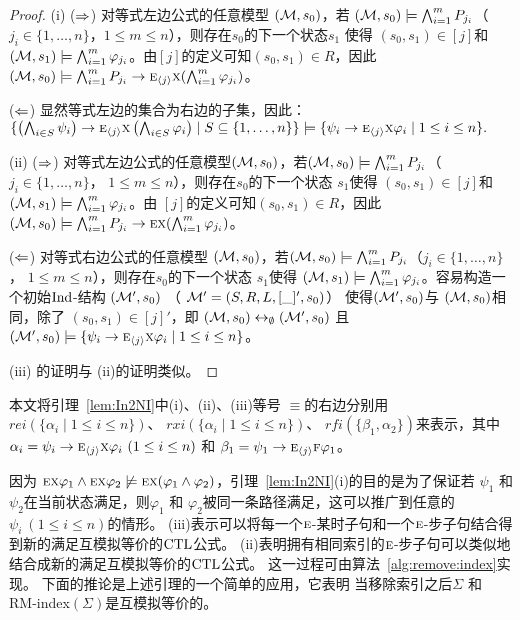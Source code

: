 \begin{proof}
	(i) ($\Rightarrow$) 对等式左边公式的任意模型 $({\cal M},s_0)$，若 $({\cal M},s_0) \models \bigwedge_{i=1}^m P_{j_i}$（ $j_i \in \{1, \dots, n\}$，$1\leq m \leq n$），则存在$s_0$的下一个状态$s_1$ 使得 $(s_0, s_1) \in [j]$和 $({\cal M}, s_1) \models \bigwedge_{i=1}^m \varphi_{j_i}$。由$[j]$的定义可知$(s_0, s_1) \in R$，因此$({\cal M}, s_0) \models \bigwedge_{i=1}^m P_{j_i} \rightarrow \textsc{e}_{{\langle{j}\rangle}} \textsc{x} (\bigwedge_{i=1}^m \varphi_{j_i})$。 %
	
	($\Leftarrow$)  显然等式左边的集合为右边的子集，因此：
	$\{\left(\bigwedge_{i\in S}\psi_i\right)\rightarrow \textsc{e}_{{\langle{j}\rangle}} \textsc{x} \left(\bigwedge_{i\in S}\varphi_i\right)\mid S\subseteq\{1,\dots, n\}\} \models \{\psi_i\rightarrow \textsc{e}_{{\langle{j}\rangle}} \textsc{x} \varphi_i \mid 1\le i\le n\}.$
	
	(ii) ($\Rightarrow$) 对等式左边公式的任意模型$({\cal M},s_0)$，若$({\cal M},s_0) \models \bigwedge_{i=1}^m P_{j_i}$（$j_i \in \{1, \dots, n\}$， $1\leq m \leq n$），则存在$s_0$的下一个状态 $s_1$使得 $(s_0, s_1) \in [j]$和$({\cal M}, s_1) \models \bigwedge_{i=1}^m \varphi_{j_i}$。由 $[j]$的定义可知$(s_0, s_1) \in R$，因此$({\cal M}, s_0) \models \bigwedge_{i=1}^m P_{j_i} \rightarrow \textsc{e} \textsc{x} (\bigwedge_{i=1}^m \varphi_{j_i})$。 %
	
	($\Leftarrow$) 对等式右边公式的任意模型 $({\cal M},s_0)$，若$({\cal M},s_0) \models \bigwedge_{i=1}^m P_{j_i}$（$j_i \in \{1, \dots, n\}$， $1\leq m \leq n$），则存在$s_0$的下一个状态 $s_1$使得 $({\cal M}, s_1) \models \bigwedge_{i=1}^m \varphi_{j_i}$。容易构造一个初始$\textrm{Ind}$-结构 $({\cal M}',s_0)$ （ ${\cal M}'=(S,R,L,[\_]',s_0)$） 使得$({\cal M}', s_0)$与 $({\cal M}, s_0)$相同，除了 $(s_0, s_1) \in [j]'$，即 $({\cal M}, s_0) \leftrightarrow_{\emptyset} ({\cal M}', s_0)$ 且 $({\cal M}',s_0) \models \{\psi_i\rightarrow \textsc{e}_{{\langle{j}\rangle}} \textsc{x} \varphi_i \mid 1\le i\le n\}$。 
	
	(iii) 的证明与 (ii)的证明类似。
\end{proof}


本文将引理~\ref{lem:In2NI}中(i)、(ii)、(iii)等号 $\equiv$的右边分别用$rei(\{\alpha_i\mid 1\le i\le n\})$、
$rxi(\{\alpha_i\mid 1\le i\le n\})$、  $rfi(\{\beta_1,\alpha_2\})$来表示，其中$\alpha_i=\psi_i\rightarrow \textsc{e}_{{\langle{j}\rangle}} \textsc{x} \varphi_i~(1\le i\le n)$ 和 $\beta_1=\psi_1 \rightarrow \textsc{e}_{{\langle{j}\rangle}}\textsc{f} \varphi_1$。



因为 $\textsc{e}\textsc{x}\varphi_1\land \textsc{e}\textsc{x}\varphi_2\not\models \textsc{e}\textsc{x}(\varphi_1\land\varphi_2)$，引理~\ref{lem:In2NI}(i)的目的是为了保证若 $\psi_1$ 和 $\psi_2$在当前状态满足，则$\varphi_1$ 和 $\varphi_2$被同一条路径满足，这可以推广到任意的 $\psi_i~(1\le i\le n)$的情形。 
(iii)表示可以将每一个$\textsc{e}$-某时子句和一个$\textsc{e}$-步子句结合得到新的满足互模拟等价的$\textrm{CTL}$公式。
(ii)表明拥有相同索引的$\textsc{e}$-步子句可以类似地结合成新的满足互模拟等价的$\textrm{CTL}$公式。
这一过程可由算法~\ref{alg:remove:index}实现。
下面的推论是上述引理的一个简单的应用，它表明 当移除索引之后$\Sigma$ 和 RM-index$(\Sigma)$是互模拟等价的。

